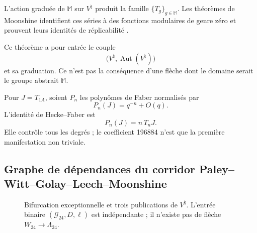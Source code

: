 \begin{theorem}
\label{p12-83-c20-s8:thm:moonshine-monstruoso-u031}
L'action graduée de \(\mathbb M\) sur \(V^\natural\) produit la famille
\(\{T_g\}_{g\in\mathbb M}\). Les théorèmes de Moonshine identifient ces
séries à des fonctions modulaires de genre zéro et prouvent leurs identités de
réplicabilité
\cite{ConwayNorton1979,Borcherds1992,FLM1988}.
\end{theorem}

Ce théorème a pour entrée le couple
\[
 \bigl(V^\natural,\operatorname{Aut}(V^\natural)\bigr)
\]
et sa graduation. Ce n'est pas la conséquence d'une flèche dont le domaine serait le
groupe abstrait \(\mathbb M\).

Pour \(J=T_{1A}\), soient \(P_n\) les polynômes de Faber normalisés par
\[
 P_n(J)=q^{-n}+O(q).
\]
L'identité de Hecke--Faber est
\begin{equation}
 P_n(J)=n\,T_nJ.
 \label{p12-83-c20-s8:eq:hecke-faber-u031}
\end{equation}
Elle contrôle tous les degrés ; le coefficient 196884 n'est que la première
manifestation non triviale.

\subsection{Graphe de dépendances du corridor Paley–Witt–Golay–Leech–Moonshine}

\begin{figure}[htbp]
\centering
{}
\caption{Bifurcation exceptionnelle et trois publications de
\(V^\natural\). L'entrée binaire \((\mathcal G_{24},D,\ell)\) est
indépendante ; il n'existe pas de flèche \(W_{24}\to\Lambda_{24}\).}
\label{p12-83-c20-s8:fig:grafo-excepcional-moonshine-u031}
\end{figure}

